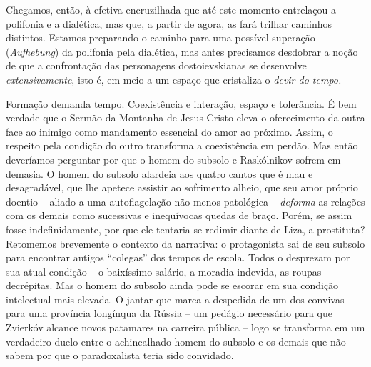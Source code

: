 {{Chegamos, então, à efetiva encruzilhada que até este momento entrelaçou
a polifonia e a dialética, mas que, a partir de agora, as fará trilhar
caminhos distintos. Estamos preparando o caminho para uma possível
superação (\emph{Aufhebung}) da polifonia pela dialética, mas antes
precisamos desdobrar a noção de que a confrontação das personagens
dostoievskianas se desenvolve \emph{extensivamente}, isto é, em meio a
um espaço que cristaliza o \emph{devir do tempo.}

Formação demanda tempo. Coexistência e interação, espaço e tolerância. É
bem verdade que o Sermão da Montanha de Jesus Cristo eleva o
oferecimento da outra face ao inimigo como mandamento essencial do amor
ao próximo. Assim, o respeito pela condição do outro transforma a
coexistência em perdão. Mas então deveríamos perguntar por que o homem
do subsolo e Raskólnikov sofrem em demasia. O homem do subsolo alardeia
aos quatro cantos que é mau e desagradável, que lhe apetece assistir ao
sofrimento alheio, que seu amor próprio doentio -- aliado a uma
autoflagelação não menos patológica -- \emph{deforma} as relações com os
demais como sucessivas e inequívocas quedas de braço. Porém, se assim
fosse indefinidamente, por que ele tentaria se redimir diante de Liza, a
prostituta? Retomemos brevemente o contexto da narrativa: o protagonista
sai de seu subsolo para encontrar antigos ``colegas'' dos tempos de
escola. Todos o desprezam por sua atual condição -- o baixíssimo
salário, a moradia indevida, as roupas decrépitas. Mas o homem do
subsolo ainda pode se escorar em sua condição intelectual mais elevada.
O jantar que marca a despedida de um dos convivas para uma província
longínqua da Rússia -- um pedágio necessário para que Zvierkóv alcance
novos patamares na carreira pública -- logo se transforma em um
verdadeiro duelo entre o achincalhado homem do subsolo e os demais que
não sabem por que o paradoxalista teria sido convidado.

}}
